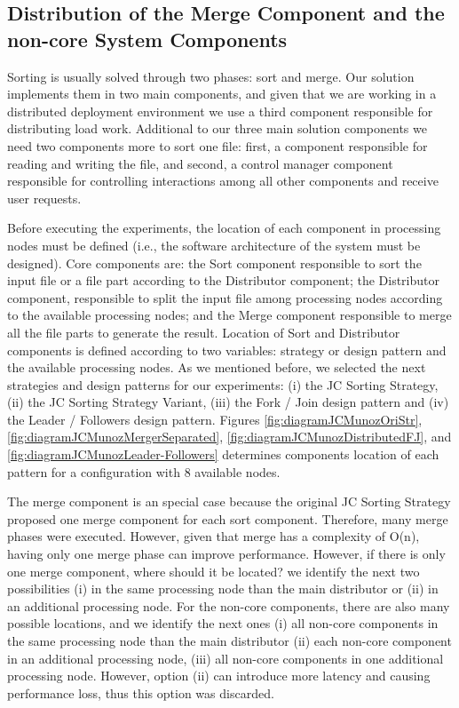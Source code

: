 \subsection{Distribution of the Merge Component and the non-core System Components}
Sorting is usually solved through two phases: sort and merge. Our solution implements them in two main components, and given that we are working in a distributed deployment environment we use a third component responsible for distributing load work. Additional to our three main solution components we need two components more to sort one file: first, a component responsible for reading and writing the file, and second, a control manager component responsible for controlling interactions among all other components and receive user requests. 

Before executing the experiments, the location of each component in processing nodes must be defined (i.e., the software architecture of the system must be designed). Core components are: the Sort component responsible to sort the input file or a file part according to the Distributor component; the Distributor component, responsible to split the input file among processing nodes according to the available processing nodes; and the Merge component responsible to merge all the file parts to generate the result. Location of Sort and Distributor components is defined according to two variables: strategy or design pattern and the available processing nodes. As we mentioned before, we selected the next strategies and design patterns for our experiments: (i) the JC Sorting Strategy, (ii) the JC Sorting Strategy Variant, (iii) the Fork / Join design pattern and (iv) the Leader / Followers design pattern. Figures \ref{fig:diagramJCMunozOriStr}, \ref{fig:diagramJCMunozMergerSeparated}, \ref{fig:diagramJCMunozDistributedFJ}, and \ref{fig:diagramJCMunozLeader-Followers} determines components location of each pattern for a configuration with 8 available nodes.

The merge component is an special case because the original JC Sorting Strategy proposed one merge component for each sort component. Therefore, many merge phases were executed. However, given that merge has a complexity of O(n), having only one merge phase can improve performance. However, if there is only one merge component, where should it be located? we identify the next two possibilities (i) in the same processing node than the main distributor or (ii) in an additional processing node. For the non-core components, there are also many possible locations, and we identify the next ones (i) all non-core components in the same processing node than the main distributor (ii) each non-core component in an additional processing node, (iii) all non-core components in one additional processing node. However, option (ii) can introduce more latency and causing performance loss, thus this option was discarded.

